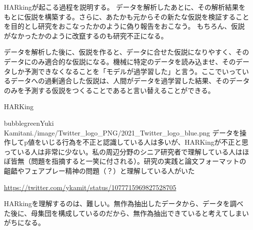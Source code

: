 HARkingが起こる過程を説明する。
データを解析したあとに、その解析結果をもとに仮説を構築する。さらに、あたかも元からその新たな仮説を検証することを目的とし研究をおこなったかのように偽り報告をおこなう。
もちろん、仮説がなかったかのように改竄するのも研究不正になる。

データを解析した後に、仮説を作ると、データに合せた仮説になりやすく、そのデータにのみ適合的な仮説になる。機械に特定のデータを読み込ませ、そのデータしか予測できなくなることを「モデルが過学習した」と言う。ここでいっているデータへの過剰適合した仮説は、人間がデータを過学習した結果、そのデータのみを予測する仮説をつくることであると言い替えることができる。



\begin{SMbox}{HARKing}
 \begin{rightbubbles}{bubblegreen}{Yuki Kamitani}{./image/Twitter_logo_PNG/2021_Twitter_logo_blue.png}
  データを操作してp値をいじる行為を不正と認識している人は多いが、HARKingが不正と思っている人は非常に少ない。私の周辺分野のシニア研究者で理解している人はほぼ皆無（問題を指摘すると一笑に付される）。研究の実践と論文フォーマットの齟齬やフェアプレー精神の問題（？）と理解している人がいた
  \begin{flushright}
   \small	\url{https://twitter.com/ykamit/status/1077715969827528705}
  \end{flushright}
 \end{rightbubbles}
 HARkingを理解するのは、難しい。無作為抽出したデータから、データを調べた後に、母集団を構成しているのだから、無作為抽出できていると考えてしまいがちになる。
\end{SMbox}


